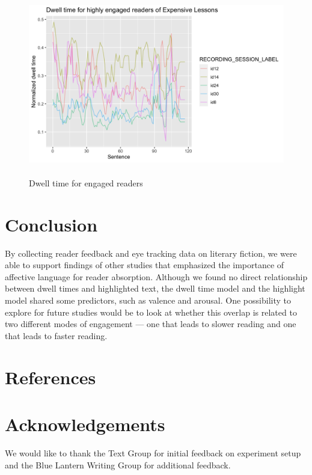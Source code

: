 \documentclass[11pt]{article}
\begin{document}
\begin{figure}[ht]
  \includegraphics[height=8cm]{engaged_dt_el}
  \caption{Dwell time for engaged readers}
  \label{fig:fig2}
\end{figure}




\section{Conclusion}

By collecting reader feedback and eye tracking data on literary fiction, we were able to support findings of other studies that emphasized the importance of affective language for reader absorption. Although we found no direct relationship between dwell times and highlighted text, the dwell time model and the highlight model shared some predictors, such as valence and arousal. One possibility to explore for future studies would be to look at whether this overlap is related to two different modes of engagement --- one that leads to slower reading and one that leads to faster reading. 


\section{References}

\nocite{Green2004,liwc_22,kuzmicova2014,brysbaert2014,Maslej2019TheTF,green_brock_kaufman_2006,Consoli2018,busselle2009,jacobs2018,jacobs2017,stockwell2002cognitive,HSU201596,willems_2015,mak2019,kunze2015,ferreira-goncalo-oliveira-2018-seeking,aryani2013,delatorre2019,andrade2020,indico2015,gerrig_1993,Magyari2020,valence_arousal_dominance_2013,Brysbaert_2015}





\section*{Acknowledgements}

We would like to thank the Text Group for initial feedback on experiment setup and the Blue Lantern Writing Group for additional feedback.
\end{document}
